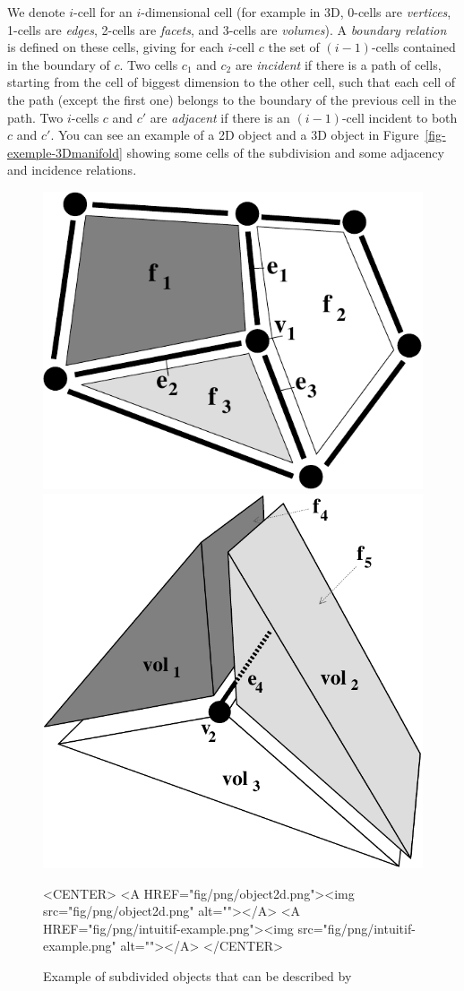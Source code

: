 We denote $i$-cell for an $i$-dimensional cell (for example in 3D,
0-cells are \emph{vertices}, 1-cells are \emph{edges}, 2-cells are
\emph{facets}, and 3-cells are \emph{volumes}). A \emph{boundary
  relation} is defined on these cells, giving for each $i$-cell $c$
the set of $(i-1)$-cells contained in the boundary of $c$.  Two cells
$c_1$ and $c_2$ are \emph{incident} if there is a path of cells,
starting from the cell of biggest dimension to the other cell, such
that each cell of the path (except the first one) belongs to the
boundary of the previous cell in the path. Two $i$-cells $c$ and $c'$
are \emph{adjacent} if there is an $(i-1)$-cell incident to both $c$
and $c'$.  You can see an example of a 2D object and a 3D object in
Figure~\ref{fig-exemple-3Dmanifold} showing some cells of the
subdivision and some adjacency and incidence relations.
\begin{figure}[ht]
  \begin{ccTexOnly}
    \begin{center}
      \includegraphics[width=.3\textwidth]
      {Combinatorial_map/fig/pdf/object2d}
      \qquad
      \includegraphics[width=.4\textwidth]
      {Combinatorial_map/fig/pdf/intuitif-example}
    \end{center}
  \end{ccTexOnly}
  \begin{ccHtmlOnly}
    <CENTER>
    <A HREF="fig/png/object2d.png"><img src="fig/png/object2d.png" alt=""></A>
    <A HREF="fig/png/intuitif-example.png"><img src="fig/png/intuitif-example.png" alt=""></A>
    </CENTER>
    \end{ccHtmlOnly}
    \caption{Example of subdivided objects that can be described by
}
\end{figure}
